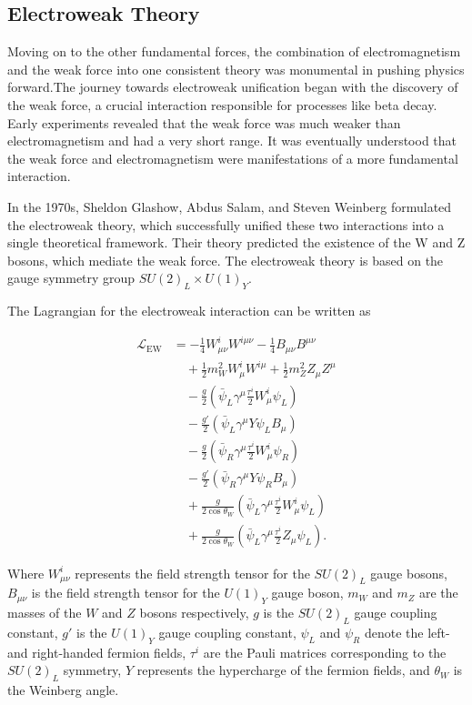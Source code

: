 \subsection{Electroweak Theory}

Moving on to the other fundamental forces,  the combination of electromagnetism  and the weak force into one consistent theory  was monumental in pushing physics forward.The journey towards electroweak unification began with the discovery of the weak force, a crucial interaction responsible for processes like beta decay.
Early experiments revealed that the weak force was much weaker than electromagnetism and had a very short range.
It was eventually understood that the weak force and electromagnetism were manifestations of a more fundamental interaction.

In the 1970s, Sheldon Glashow, Abdus Salam, and Steven Weinberg formulated the electroweak theory, which successfully unified these two interactions into a single theoretical framework.
Their theory predicted the existence of the W and Z bosons, which mediate the weak force.
The electroweak theory is based on the gauge symmetry group $SU(2)_L \times U(1)_Y$.

The Lagrangian for the electroweak interaction can be written as

\begin{align}
\mathcal{L}_{\text{EW}} &= -\frac{1}{4} W^i_{\mu \nu} W^{i \mu \nu} - \frac{1}{4} B_{\mu \nu} B^{\mu \nu} \\
&\quad + \frac{1}{2} m_W^2 W^i_\mu W^{i \mu} + \frac{1}{2} m_Z^2 Z_\mu Z^\mu \\
&\quad - \frac{g}{2} \left( \bar{\psi}_L \gamma^\mu \frac{\tau^i}{2} W^i_\mu \psi_L \right) \\
&\quad - \frac{g'}{2} \left( \bar{\psi}_L \gamma^\mu Y \psi_L B_\mu \right) \\
&\quad - \frac{g}{2} \left( \bar{\psi}_R \gamma^\mu \frac{\tau^i}{2} W^i_\mu \psi_R \right) \\
&\quad - \frac{g'}{2} \left( \bar{\psi}_R \gamma^\mu Y \psi_R B_\mu \right) \\
&\quad + \frac{g}{2 \cos \theta_W} \left( \bar{\psi}_L \gamma^\mu \frac{\tau^i}{2} W^i_\mu \psi_L \right) \\
&\quad + \frac{g}{2 \cos \theta_W} \left( \bar{\psi}_L \gamma^\mu \frac{\tau^i}{2} Z_\mu \psi_L \right).
\end{align}

Where $W^i_{\mu \nu}$ represents the field strength tensor for the $SU(2)_L$ gauge bosons, $B_{\mu \nu}$ is the field strength tensor for the $U(1)_Y$ gauge boson, $m_W$ and $m_Z$ are the masses of the $W$ and $Z$ bosons respectively, $g$ is the $SU(2)_L$ gauge coupling constant, $g'$ is the $U(1)_Y$ gauge coupling constant, $\psi_L$ and $\psi_R$ denote the left- and right-handed fermion fields, $\tau^i$ are the Pauli matrices corresponding to the $SU(2)_L$ symmetry, $Y$ represents the hypercharge of the fermion fields, and $\theta_W$ is the Weinberg angle.



